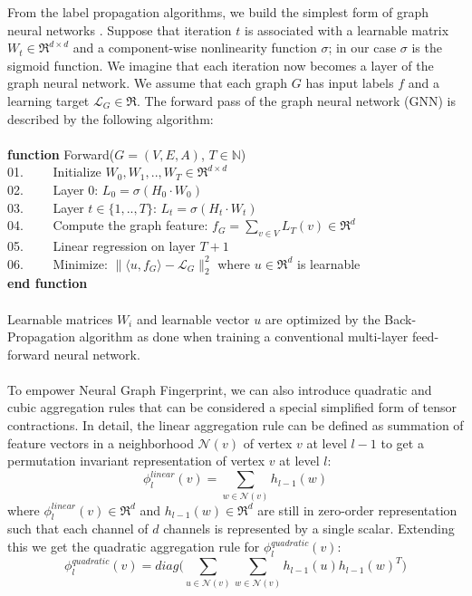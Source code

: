 \documentclass[a4paper]{article}
\begin{document}
From the label propagation algorithms, we build the simplest form of graph neural networks \cite{Steven, Duvenaud, Thomas}. Suppose that iteration $t$ is associated with a learnable matrix $W_t \in \Re^{d \times d}$ and a component-wise nonlinearity function $\sigma$; in our case $\sigma$ is the sigmoid function. We imagine that each iteration now becomes a layer of the graph neural network. We assume that each graph $G$ has input labels $f$ and a learning target $\mathcal{L}_G \in \Re$. The forward pass of the graph neural network (GNN) is described by the following algorithm: \\ \\
\textbf{function} Forward($G = (V, E, A)$, $T \in \mathbb{N}$) \\
01. \ \ \ \ Initialize $W_0, W_1, .., W_T \in \Re^{d \times d}$ \\
02. \ \ \ \ Layer $0$: $L_0 = \sigma(H_0 \cdot W_0)$ \\
03. \ \ \ \ Layer $t \in \{1, .., T\}$: $L_t = \sigma(H_t \cdot W_t)$ \\
04. \ \ \ \ Compute the graph feature: $f_G = \sum_{v \in V} L_T(v) \in \Re^d$ \\
05. \ \ \ \ Linear regression on layer $T + 1$ \\
06. \ \ \ \ Minimize: $\|\langle u, f_G \rangle - \mathcal{L}_G\|_2^2$ where $u \in \Re^d$ is learnable \\
\textbf{end function} \\ \\
Learnable matrices $W_i$ and learnable vector $u$ are optimized by the Back-Propagation algorithm as done when training a conventional multi-layer feed-forward neural network. \\ \\
To empower Neural Graph Fingerprint, we can also introduce quadratic and cubic aggregation rules that can be considered a special simplified form of tensor contractions. In detail, the linear aggregation rule can be defined as summation of feature vectors in a neighborhood $\mathcal{N}(v)$ of vertex $v$ at level $l - 1$ to get a permutation invariant representation of vertex $v$ at level $l$:
$$\phi_l^{linear}(v) = \sum\limits_{w \in \mathcal{N}(v)} h_{l - 1}(w)$$
where $\phi_l^{linear}(v) \in \Re^d$ and $h_{l - 1}(w) \in \Re^d$ are still in zero-order representation such that each channel of $d$ channels is represented by a single scalar. Extending this we get the quadratic aggregation rule for $\phi_l^{quadratic}(v)$:
$$\phi_l^{quadratic}(v) = diag \bigg(\sum\limits_{u \in \mathcal{N}(v)} \sum\limits_{w \in \mathcal{N}(v)} h_{l - 1}(u) h_{l - 1}(w)^T \bigg)$$
\end{document}
